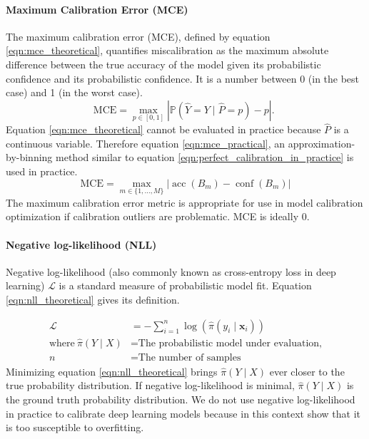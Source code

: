 \paragraph{Maximum Calibration Error (MCE)}
The maximum calibration error (MCE), defined by equation \ref{eqn:mce_theoretical}, quantifies miscalibration as the maximum absolute difference between the true accuracy of the model given its probabilistic confidence and its probabilistic confidence. It is a number between 0 (in the best case) and 1 (in the worst case).
\begin{equation}
  \label{eqn:mce_theoretical}
  \mathrm{MCE}=\max _{p \in[0,1]}|\mathbb{P}(\hat{Y}=Y \mid \hat{P}=p)-p| \text {. }
\end{equation}
Equation \ref{eqn:mce_theoretical} cannot be evaluated in practice because $\hat{P}$ is a continuous variable. Therefore equation \ref{eqn:mce_practical}, an approximation-by-binning method similar to equation \ref{eqn:perfect_calibration_in_practice} is used in practice.
\begin{equation}
  \label{eqn:mce_practical}
  \mathrm{MCE}=\max _{m \in\{1, \ldots, M\}}\left|\operatorname{acc}\left(B_{m}\right)-\operatorname{conf}\left(B_{m}\right)\right|
\end{equation}
The maximum calibration error metric is appropriate for use in model calibration optimization if calibration outliers are problematic. MCE is ideally 0.

\paragraph{Negative log-likelihood (NLL)}
Negative log-likelihood (also commonly known as cross-entropy loss in deep learning) $\mathcal{L}$ is a standard measure of probabilistic model fit. Equation \ref{eqn:nll_theoretical} gives its definition.

\begin{align}
  \label{eqn:nll_theoretical}
  \mathcal{L} &= -\sum_{i=1}^{n} \log \left(\hat{\pi}\left(y_{i} \mid \mathbf{x}_{i}\right)\right) \\ \nonumber
  \text{where}~\hat{\pi}(Y \mid X) &= \text{The probabilistic model under evaluation,} \\ \nonumber
  n &= \text{The number of samples}
\end{align}
Minimizing equation \ref{eqn:nll_theoretical} brings $\hat{\pi}(Y \mid X)$ ever closer to the true probability distribution. If negative log-likelihood is minimal, $\hat{\pi}(Y \mid X)$ is the ground truth probability distribution. We do not use negative log-likelihood in practice to calibrate deep learning models because in this context \cite{guo2017calibration} show that it is too susceptible to overfitting.

